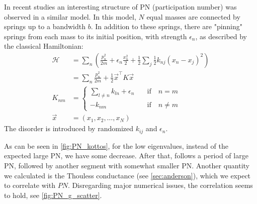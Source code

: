 In recent studies \cite{bodyfelt_unpub} an interesting structure of
PN (participation number) was observed in a similar model. In this model,
$N$ equal masses are connected by springs up to a bandwidth $b$. In addition to these
springs, there are "pinning" springs from each mass to its initial position, with
strength $\epsilon_n$, as described by the classical Hamiltonian:
\begin{align}
\mathcal{H} &= \sum_n \left( \frac{p_n^2}{2m} +\epsilon_n\frac{x_n^2}{2}+ \frac{1}{2}\sum_{j} \frac{1}{2}k_{nj} (x_n-x_j)^2 \right) \\
            &= \sum_{n} \frac{p_n^2}{2m} +  \frac{1}{2}\vec{x}^{\intercal} K \vec{x} \\
            K_{nm} &= \begin{cases} 
            \sum_{l\ne n} k_{ln} +\epsilon_n \quad &\textrm{if}\quad n=m \\ 
            - k_{nm}  \quad &\textrm{if}\quad n\ne m
            \end{cases}\\
            \vec{x} &= (x_1,x_2,\ldots,x_N)
\end{align}
The disorder is introduced by randomized $k_{ij}$ and $\epsilon_n$.

As can be seen
in \autoref{fig:PN_kottos}, for the low eigenvalues, instead of the 
expected large PN, we have some decrease. After that, follows a period
of large PN, followed by another segment with somewhat smaller PN.
Another quantity we calculated is the Thouless conductance (see \autoref{sec:anderson}), 
which we expect to correlate with $PN$. Disregarding major numerical issues,
the correlation seems to hold, see \autoref{fig:PN_g_scatter}.






